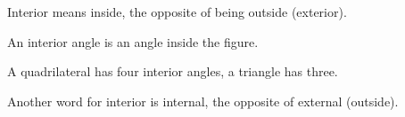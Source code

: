 Interior means inside, the opposite of being outside (exterior).
\par
An interior angle is an angle inside the figure.
\par
A quadrilateral has four interior angles, a triangle has three.
\par
Another word for interior is internal, the opposite of external (outside).